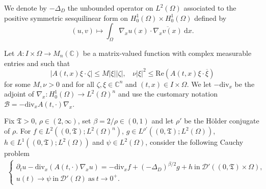 \documentclass[11pt, letterpaper]{amsart}
\theoremstyle{definition}
\theoremstyle{remark}
\numberwithin{equation}{section}
\begin{document}
We denote by $-\Delta_D $ the unbounded operator on $L^2(\Omega)$ associated to the positive symmetric sesquilinear form on $H^1_0(\Omega) \times H^1_0(\Omega)$ defined by
\begin{equation*}
    (u,v) \mapsto \int_{\Omega} \nabla_x u(x) \cdot  \overline{\nabla_x v(x)} \ \mathrm dx.
\end{equation*}

Let $A: I\times \Omega \rightarrow M_n(\mathbb{C})$ be a matrix-valued function with complex measurable entries and such that 
\begin{equation}\label{ellipticité A}
\left | A(t,x)\xi \cdot \zeta  \right |\leq M \left | \xi \right |\left | \zeta  \right |, \ \ \ \  
\nu \left | \xi \right |^2\leq \mathrm{Re}(A(t,x)\xi\cdot \overline{\xi})
\end{equation}
for some $M,\nu>0$ and for all $\zeta, \xi \in \mathbb{C}^n$ and $(t,x) \in I\times \Omega$.
We let $-\mathrm{div}_x$ be the adjoint of $\nabla_x:H^1_0(\Omega) \to L^2(\Omega)^n $ and use the customary notation $\mathcal{B}= -\mathrm{div}_x A(t,\cdot)\nabla_x.$

Fix $\mathfrak{T}>0$,  $\rho \in (2,\infty)$, set $\beta={2}/{\rho} \in (0,1)$ and let $\rho'$ be the H\"older conjugate of $\rho$. For  $ {f} \in L^2((0,\mathfrak{T});L^2(\Omega)^n)$, $g\in L^{\rho'}((0,\mathfrak{T});L^2(\Omega))$, $h \in L^1((0,\mathfrak{T});L^2(\Omega))$ and $\psi \in L^2(\Omega)$,
consider the following Cauchy problem 
\begin{align}\label{Pb Cauchy Dirichlet}
\left\{
    \begin{array}{ll}
        \partial_t u - \mathrm{div}_x(A(t,\cdot)\nabla_x u) =   -\mathrm{div}_x {f} +(-\Delta_D)^{\beta/2}{g}+h  \ \mathrm{in} \  \mathcal{D}'((0,\mathfrak{T})\times \Omega), \\
        u(t) \rightarrow \psi \  \mathrm{ in } \ \mathcal{D'}(\Omega) \ \mathrm{as} \ t \rightarrow 0^+.
    \end{array}
\right.
\end{align}
\end{document}
